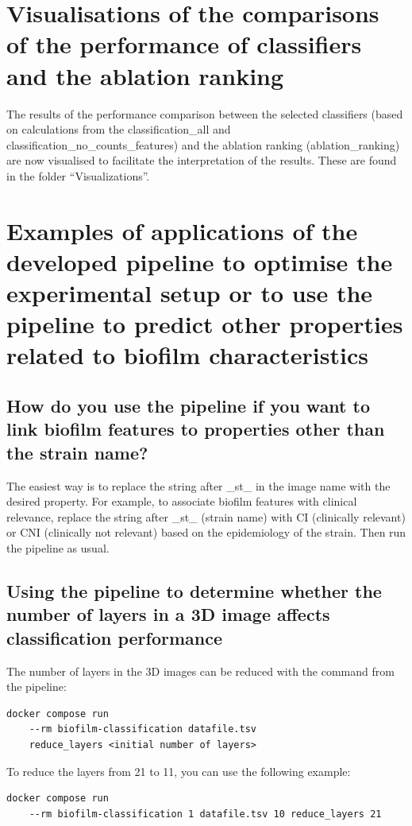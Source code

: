\documentclass{ol-softwaremanual}
\begin{document}
\section{Visualisations of the comparisons of the performance of classifiers and the ablation ranking}
The results of the performance comparison between the selected classifiers (based on calculations from the classification\_all and\\ classification\_no\_counts\_features) and the ablation ranking (ablation\_ranking) are now visualised to facilitate the interpretation of the results. These are found in the folder “Visualizations”.

\section{Examples of applications of the developed pipeline to optimise the experimental setup or to use the pipeline to predict other properties related to biofilm characteristics}

\subsection{How do you use the pipeline if you want to link biofilm features to properties other than the strain name?}

The easiest way is to replace the string after \_st\_ in the image name with the desired property. For example, to associate biofilm features with clinical relevance, replace the string after \_st\_ (strain name) with CI (clinically relevant) or CNI (clinically not relevant) based on the epidemiology of the strain. Then run the pipeline as usual.

\subsection{Using the pipeline to determine whether the number of layers in a 3D image affects classification performance}
The number of layers in the 3D images can be reduced with the command from the pipeline:
\begin{verbatim}
docker compose run 
	--rm biofilm-classification datafile.tsv 
	reduce_layers <initial number of layers>
\end{verbatim}

To reduce the layers from 21 to 11, you can use the following example:
\begin{verbatim}
docker compose run 
    --rm biofilm-classification 1 datafile.tsv 10 reduce_layers 21
\end{verbatim}
\end{document}
